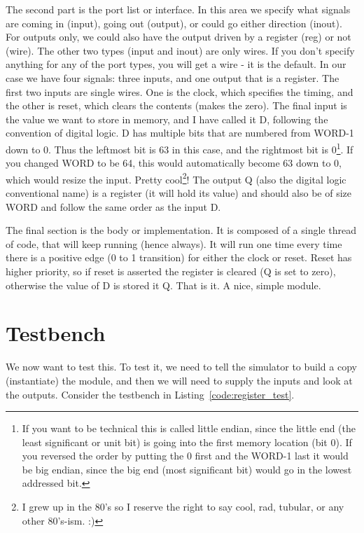 The second part is the port list or interface.  In this area we specify what signals are coming in (input), going out (output), or could go either direction (inout).  For outputs only, we could also have the output driven by a register (reg) or not (wire).  The other two types (input and inout) are only wires.  If you don't specify anything for any of the port types, you will get a wire - it is the default.  In our case we have four signals: three inputs, and one output that is a register.  The first two inputs are single wires.  One is the clock, which specifies the timing, and the other is reset, which clears the contents (makes the zero).  The final input is the value we want to store in memory, and I have called it D, following the convention of digital logic.  D has multiple bits that are numbered from WORD-1 down to 0.  Thus the leftmost bit is 63 in this case, and the rightmost bit is 0\footnote{If you want to be technical this is called little endian, since the little end (the least significant or unit bit) is going into the first memory location (bit 0).  If you reversed the order by putting the 0 first and the WORD-1 last it would be big endian, since the big end (most significant bit) would go in the lowest addressed bit.}.  If you changed WORD to be 64, this would automatically become 63 down to 0, which would resize the input.  Pretty cool\footnote{I grew up in the 80's so I reserve the right to say cool, rad, tubular, or any other 80's-ism.  :) }!  The output Q (also the digital logic conventional name) is a register (it will hold its value) and should also be of size WORD and follow the same order as the input D.

The final section is the body or implementation.  It is composed of a single thread of code, that will keep running (hence always).  It will run one time every time there is a positive edge (0 to 1 transition) for either the clock or reset.  Reset has higher priority, so if reset is asserted the register is cleared (Q is set to zero), otherwise the value of D is stored it Q.  That is it.  A nice, simple module.

\section{Testbench}

We now want to test this.  To test it, we need to tell the simulator to build a copy (instantiate) the module, and then we will need to supply the inputs and look at the outputs.  Consider the testbench in Listing~\ref{code:register_test}.

